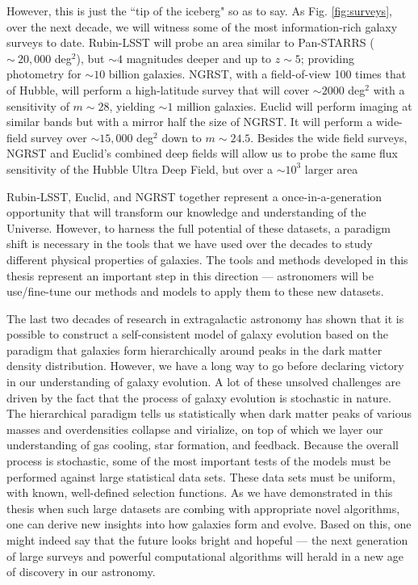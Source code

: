 However, this is just the ``tip of the iceberg" so as to say. As Fig. \ref{fig:surveys}, over the next decade, we will witness some of the most information-rich galaxy surveys to date. Rubin-LSST will probe an area similar to Pan-STARRS ($\sim~20,000$ deg$^2$), but $\sim4$ magnitudes deeper and up to $z\sim5$; providing photometry for $\sim10$ billion galaxies. NGRST, with a field-of-view 100 times that of Hubble, will perform a high-latitude survey that will cover $\sim2000$ deg$^2$ with a sensitivity of $m\sim28$, yielding $\sim1$ million galaxies. Euclid will perform imaging at similar bands but with a mirror half the size of NGRST. It will perform a wide-field survey over $\sim15,000$ deg$^2$ down to $m\sim24.5$. Besides the wide field surveys, NGRST and Euclid’s combined deep fields will allow us to probe the same flux sensitivity of the Hubble Ultra Deep Field, but over a $\sim10^3$ larger area 

Rubin-LSST, Euclid, and NGRST together represent a once-in-a-generation opportunity that will transform our knowledge and understanding of the Universe. However, to harness the full potential of these datasets, a paradigm shift is necessary in the tools that we have used over the decades to study different physical properties of galaxies. The tools and methods developed in this thesis represent an important step in this direction --- astronomers will be use/fine-tune our methods and models to apply them to these new datasets. 

 The last two decades of research in extragalactic astronomy has shown that it is possible to construct a self-consistent model of galaxy evolution based on the paradigm that galaxies form hierarchically around peaks in the dark matter density distribution. However, we have a long way to go before declaring victory in our understanding of galaxy evolution. A lot of these unsolved challenges are driven by the fact that the process of galaxy evolution is stochastic in nature. The hierarchical paradigm tells us statistically when dark matter peaks of various masses and overdensities collapse and virialize, on top of which we layer our understanding of gas cooling, star formation, and feedback. Because the overall process is stochastic, some of the most important tests of the models must be performed against large statistical data sets. These data sets must be uniform, with known, well-defined selection functions. As we have demonstrated in this thesis when such large datasets are combing with appropriate novel algorithms, one can derive new insights into how galaxies form and evolve. Based on this, one might indeed say that the future looks bright and hopeful --- the next generation of large surveys and powerful computational algorithms will herald in a new age of discovery in our astronomy. 


